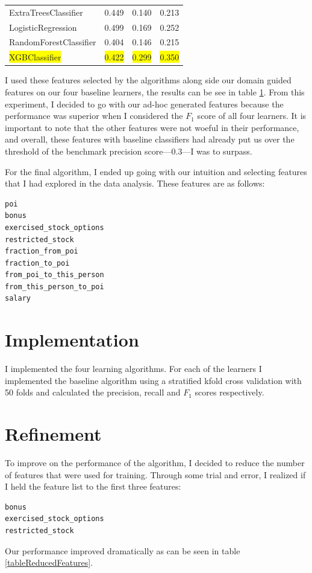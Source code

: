 \documentclass[titlepage,numbers=noenddot,headinclude,%
               footinclude=true,abstractoff,BCOR=5mm,%
               paper=a4,fontsize=11pt,ngerman,american]{scrreprt}
\numberwithin{theorem}{chapter}
\numberwithin{definition}{chapter}
\numberwithin{algorithm}{chapter}
\numberwithin{figure}{chapter}
\numberwithin{table}{chapter}
\numberwithin{equation}{chapter}
\newcommand{\hilight}[1]{\colorbox{yellow}{#1}}
\begin{document}
\begin{table}[!htbp]
\begin{tabular}{|p{6cm}|p{1.5cm}|p{1.5cm}|p{1.5cm}|}
ExtraTreesClassifier     &  0.449       &  0.140     &  0.213     \\
LogisticRegression       &  0.499       &  0.169     &  0.252     \\
RandomForestClassifier   &  0.404       &  0.146     &  0.215     \\
\hilight{XGBClassifier}  &  \hilight{0.422} &  \hilight{0.299} &  \hilight{0.350}     \\

\hline %

\end{tabular}
\label{tableBenchMarkScores}
\end{table}

I used these features selected by the algorithms along side our domain guided features on our four baseline learners, the results can be see in table \ref{tableBenchMarkScores}. From this experiment, I decided to go with our ad-hoc generated features because the performance was superior when I considered the $F_1$ score of all four learners. It is important to note that the other features were not woeful in their performance, and overall, these features with baseline classifiers had already put us over the threshold of the benchmark precision score---0.3---I was to surpass.

For the final algorithm, I ended up going with our intuition and selecting features that I had explored in the data analysis. These features are as follows:
\begin{verbatim}
poi
bonus
exercised_stock_options
restricted_stock
fraction_from_poi
fraction_to_poi
from_poi_to_this_person
from_this_person_to_poi
salary
\end{verbatim}


\section*{Implementation}

I implemented the four learning algorithms. For each of the learners I implemented the baseline algorithm using a stratified kfold cross validation with 50 folds and calculated the precision, recall and $F_1$ scores respectively.


\section*{Refinement}
To improve on the performance of the algorithm, I decided to reduce the number of features that were used for training. Through some trial and error, I realized if I held the feature list to the first three features:
\begin{verbatim}
bonus
exercised_stock_options
restricted_stock
\end{verbatim}
Our performance improved dramatically as can be seen in table \ref{tableReducedFeatures}.
\end{document}
